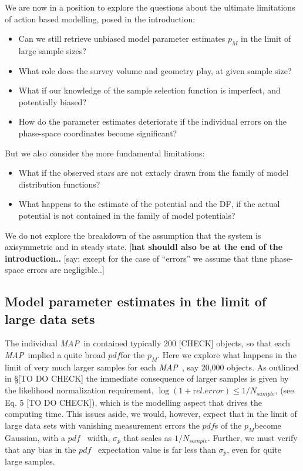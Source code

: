 \documentclass[12pt,preprint]{aastex}
\newcommand{\pdf}{\ensuremath{pdf}}
\newcommand{\pmodel}{\ensuremath{p_M}}
\newcommand{\MAP}{{\sl MAP~}}
\begin{document}
We are now in a position to explore the questions about the ultimate limitations of action based modelling, posed in the introduction: 
\begin{itemize}
\item Can we still retrieve unbiased  model parameter estimates $p_M$ in the limit of large sample sizes? 
\item What role does the survey volume and geometry play, at given sample size? 
\item What if our knowledge of the sample selection function is imperfect, and potentially biased? 
\item How do the parameter estimates deteriorate if the individual errors on the phase-space coordinates become significant? 
\end{itemize}
But we also consider the more fundamental limitations:
\begin{itemize}
\item What if the observed stars are not extacly drawn from the family of model distribution functions? 
\item What happens to the estimate of the potential and the DF, if the actual potential is not contained in the family of model potentials?
\end{itemize}
We do not explore the breakdown of the assumption that the system is axisymmetric and in steady state.
[{\bf hat shouldl also be at the end of the introduction..}
[say: except for the case of ``errors'' we assume that thne phase-space errors are negligible..]



\subsection{Model parameter estimates in the limit of large data sets}

The individual \MAP in \citet{bov13} contained typically 200 [CHECK] objects, so that each \MAP implied a quite broad \pdf  for the \pmodel .
Here we explore what happens in the limit of very much larger samples for each \MAP , say 20,000 objects. As outlined in \S [TO DO CHECK] the immediate consequence of larger samples is given by the likelihood normalization requirement, $\log(1+{\mathrm rel. error})\le 1/N_{sample}$, (see Eq. 5 [TO DO CHECK]), which is the modelling aspect that drives the computing time. This issues aside, we would, however, expect that in the limit of large data sets with vanishing measurement errors the \pdf s of the \pmodel become Gaussian, with a \pdf~ width, $\sigma_p$ that scales as $1/N_{sample}$. Further, we must verify that any bias in the \pdf~ expectation value is far less than 
$\sigma_p$, even for quite large samples.
\end{document}

